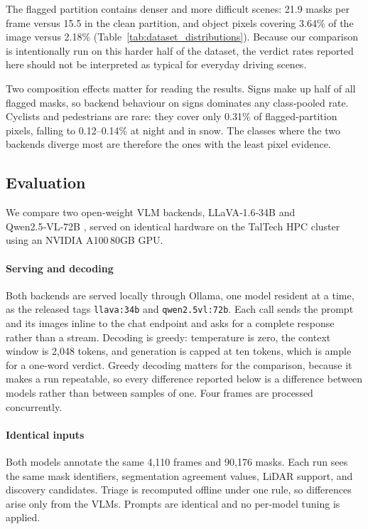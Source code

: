 \documentclass[a4paper,twoside]{article}
\begin{document}
The flagged partition contains denser and more difficult scenes: 21.9 masks per frame versus 15.5 in the clean partition, and object pixels covering 3.64\% of the image versus 2.18\% (Table~\ref{tab:dataset_distributions}).  
Because our comparison is intentionally run on this harder half of the dataset, the verdict rates reported here should not be interpreted as typical for everyday driving scenes.

Two composition effects matter for reading the results.  
Signs make up half of all flagged masks, so backend behaviour on signs dominates any class‑pooled rate.  
Cyclists and pedestrians are rare: they cover only 0.31\% of flagged‑partition pixels, falling to 0.12–0.14\% at night and in snow.  
The classes where the two backends diverge most are therefore the ones with the least pixel evidence.




\subsection{Evaluation}
\label{sec:evaluation}

We compare two open‑weight VLM backends, LLaVA‑1.6‑34B \cite{liu2024llava} and Qwen2.5‑VL‑72B \cite{bai2025qwen25vl}, served on identical hardware on the TalTech HPC cluster~\cite{herrmann} using an NVIDIA A100\,80GB GPU.

\paragraph{Serving and decoding}
Both backends are served locally through Ollama, one model resident at a time, as the released tags \texttt{llava:34b} and \texttt{qwen2.5vl:72b}.
Each call sends the prompt and its images inline to the chat endpoint and asks for a complete response rather than a stream.
Decoding is greedy: temperature is zero, the context window is 2{,}048 tokens, and generation is capped at ten tokens, which is ample for a one‑word verdict.
Greedy decoding matters for the comparison, because it makes a run repeatable, so every difference reported below is a difference between models rather than between samples of one.
Four frames are processed concurrently.

\paragraph{Identical inputs}
Both models annotate the same 4,110 frames and 90,176 masks.
Each run sees the same mask identifiers, segmentation agreement values, LiDAR support, and discovery candidates.
Triage is recomputed offline under one rule, so differences arise only from the VLMs.
Prompts are identical and no per‑model tuning is applied.
\end{document}

